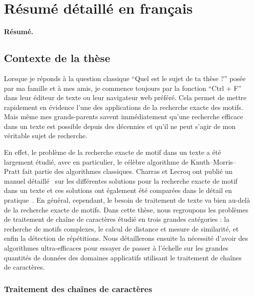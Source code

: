 \chapter*{Résumé détaillé en français}\setcounter{page}{1}

\textbf{Résumé.}
\newpage

\section*{Contexte de la thèse}

Lorsque je réponds à la question classique ``Quel est le sujet de ta thèse ?'' posée par ma famille et à mes amis, je commence toujours par la fonction ``Ctrl + F'' dans leur éditeur de texte ou leur navigateur web préféré. Cela permet de mettre rapidement en évidence l'une des applications de la recherche exacte des motifs.
Mais même mes grands-parents savent immédiatement qu'une recherche efficace dans un texte est possible depuis des décennies et qu'il ne peut s'agir de mon véritable sujet de recherche.

En effet, le problème de la recherche exacte de motif dans un texte a été largement étudié, avec en particulier, le célèbre algorithme de Knuth--Morris--Pratt fait partie des algorithmes classiques. Charras et Lecroq ont publié un manuel détaillé~\cite{Charras2004} sur les différentes solutions pour la recherche exacte de motif dans un texte et ces solutions ont également été comparées dans le détail en pratique~\cite{DBLP:journals/corr/abs-1012-2547, faro2013exact}. En général, cependant, le besoin de traitement de texte va bien au-delà de la recherche exacte de motifs. Dans cette thèse, nous regroupons les problèmes de traitement de chaîne de caractères étudié en trois grandes catégories : la recherche de motifs complexes, le calcul de distance et mesure de similarité, et enfin la détection de répétitions. Nous détaillerons ensuite la nécessité d'avoir des algorithmes ultra-efficaces pour essayer de passer à l'échelle sur les grandes quantités de données des domaines applicatifs utilisant le traitement de chaînes de caractères.

\subsection*{Traitement des chaînes de caractères}

